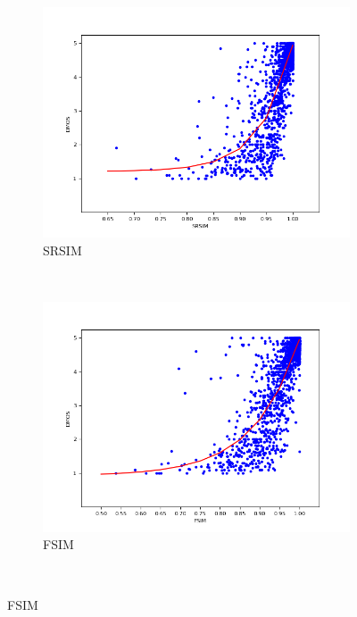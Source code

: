 \begin{figure}[H]
  \centering
  \begin{subfigure}[b]{0.5\textwidth}
    \includegraphics[width=\textwidth]{figures/srsim.png}
    \caption{SRSIM}
    \label{fig:srsim}
  \end{subfigure}%
  ~ %
  \begin{subfigure}[b]{0.5\textwidth}
    \includegraphics[width=\textwidth]{figures/fsim.png}
    \caption{FSIM}
    \label{fig:fsim}
  \end{subfigure}
  ~ %

\end{figure}
